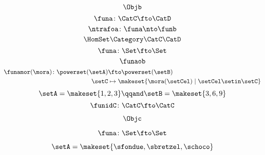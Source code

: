 \begin{forslides}
\begin{equation}
            \label{eq:slides_mora_objb}
            \Objb
        \end{equation}
        \begin{equation}
            \label{eq:slides_funa}
            \funa\colon\CatC\fto\CatD
        \end{equation}
        \begin{equation}
            \label{eq:slides_ntrafoa}
            \ntrafoa\colon\funa\nto\funb
        \end{equation}
        \begin{equation}
            \label{eq:slides_hom}
            \HomSet\Category\CatC\CatD
        \end{equation}
        \begin{equation}
            \label{eq:pow_fun_1}
            \funa\colon \Set \fto \Set
        \end{equation}
        \begin{equation}
            \label{eq:pow_fun_2}
            \funaob
        \end{equation}
        \begin{equation}
            \label{eq:pow_fun_3}
            \begin{aligned}
                \funamor(\mora)\colon \powerset(\setA) & \fto \powerset(\setB) \\
                \setC                                  & \mapsto \makeset{ \mora(\setCel) \mid \setCel \setin \setC}
            \end{aligned}
        \end{equation}
        \begin{equation}
            \label{eq:pow_fun_4}
            \setA=\makeset{ 1,2,3} \qqand \setB=\makeset{3,6,9}
        \end{equation}
        \begin{equation}
            \label{eq:idfun}
            \funidC \colon \CatC \fto \CatC
        \end{equation}
        
    
    \begin{equation}
        \label{eq:slides-translation-00}
        \Objc
    \end{equation}

    \begin{equation}
        \label{eq:slides-translation-01}
        \funa\colon \Set \fto \Set
    \end{equation}

    \begin{equation}
        \label{eq:slides-translation-02}
        \setA = \makeset{\sfondue, \sbretzel, \schoco}
    \end{equation}


\end{forslides}
